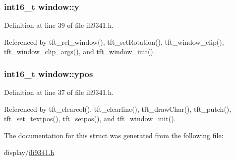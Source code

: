 \hypertarget{structwindow_a95c7023fc42e79ab42c291b90a490776}{
\subsubsection[{y}]{\setlength{\rightskip}{0pt plus 5cm}int16\-\_\-t window\-::y}}\label{structwindow_a95c7023fc42e79ab42c291b90a490776}


Definition at line 39 of file ili9341.\-h.



Referenced by tft\-\_\-rel\-\_\-window(), tft\-\_\-set\-Rotation(), tft\-\_\-window\-\_\-clip(), tft\-\_\-window\-\_\-clip\-\_\-args(), and tft\-\_\-window\-\_\-init().

\hypertarget{structwindow_a64bdec4f0ee274a96d696b16de783746}{
\subsubsection[{ypos}]{\setlength{\rightskip}{0pt plus 5cm}int16\-\_\-t window\-::ypos}}\label{structwindow_a64bdec4f0ee274a96d696b16de783746}


Definition at line 37 of file ili9341.\-h.



Referenced by tft\-\_\-cleareol(), tft\-\_\-clearline(), tft\-\_\-draw\-Char(), tft\-\_\-putch(), tft\-\_\-set\-\_\-textpos(), tft\-\_\-setpos(), and tft\-\_\-window\-\_\-init().



The documentation for this struct was generated from the following file\-:\begin{DoxyCompactItemize}
\item 
display/\hyperlink{ili9341_8h}{ili9341.\-h}\end{DoxyCompactItemize}
